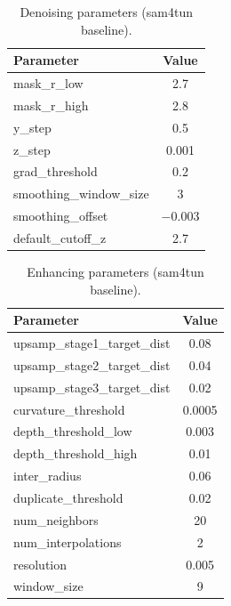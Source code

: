 \begin{table}[ht]
\caption{Denoising parameters (sam4tun baseline).}\label{tab:denoise-params}
\begin{tabular*}{\tblwidth}{@{} l c @{}}
\toprule
Parameter & Value \\
\midrule
mask\_r\_low & 2.7 \\
mask\_r\_high & 2.8 \\
y\_step & 0.5 \\
z\_step & 0.001 \\
grad\_threshold & 0.2 \\
smoothing\_window\_size & 3 \\
smoothing\_offset & $-0.003$ \\
default\_cutoff\_z & 2.7 \\
\bottomrule
\end{tabular*}
\end{table}

\begin{table}[ht]
\caption{Enhancing parameters (sam4tun baseline).}\label{tab:enhance-params}
\begin{tabular*}{\tblwidth}{@{} l c @{}}
\toprule
Parameter & Value \\
\midrule
upsamp\_stage1\_target\_dist & 0.08 \\
upsamp\_stage2\_target\_dist & 0.04 \\
upsamp\_stage3\_target\_dist & 0.02 \\
curvature\_threshold & 0.0005 \\
depth\_threshold\_low & 0.003 \\
depth\_threshold\_high & 0.01 \\
inter\_radius & 0.06 \\
duplicate\_threshold & 0.02 \\
num\_neighbors & 20 \\
num\_interpolations & 2 \\
resolution & 0.005 \\
window\_size & 9 \\
\bottomrule
\end{tabular*}
\end{table}

